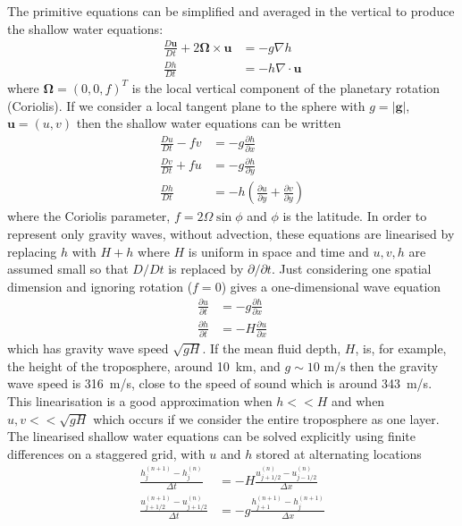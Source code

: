 The primitive equations can be simplified and averaged in the vertical
to produce the shallow water equations:
\begin{align}
\frac{D\mathbf{u}}{Dt}+2\bm{\Omega}\times\mathbf{u} & =-g\nabla h\label{eq:SWu_vec}\\
\frac{Dh}{Dt} & =-h\nabla\cdot\mathbf{u}\label{eq:SWh_vec}
\end{align}
where $\bm{\Omega}=\left(0,0,f\right)^{T}$ is the local vertical
component of the planetary rotation (Coriolis). If we consider a local
tangent plane to the sphere with $g=|\mathbf{g}|$, $\mathbf{u}=(u,v)$
then the shallow water equations can be written
\begin{align}
\frac{Du}{Dt}-fv & =-g\frac{\partial h}{\partial x}\label{eq:SWu}\\
\frac{Dv}{Dt}+fu & =-g\frac{\partial h}{\partial y}\label{eq:SWv}\\
\frac{Dh}{Dt} & =-h\left(\frac{\partial u}{\partial y}+\frac{\partial v}{\partial y}\right)\label{eq:SWh}
\end{align}
where the Coriolis parameter, $f=2\Omega\sin\phi$ and $\phi$ is
the latitude. In order to represent only gravity waves, without advection,
these equations are linearised by replacing $h$ with $H+h$ where
$H$ is uniform in space and time and $u,v,h$ are assumed small so
that $D/Dt$ is replaced by $\partial/\partial t$. Just considering
one spatial dimension and ignoring rotation ($f=0$) gives a one-dimensional
wave equation
\begin{align}
\frac{\partial u}{\partial t} & =-g\frac{\partial h}{\partial x}\label{eq:linSWu}\\
\frac{\partial h}{\partial t} & =-H\frac{\partial u}{\partial x}\label{eq:linSWh}
\end{align}
which has gravity wave speed $\sqrt{gH}$. If the mean fluid depth,
$H$, is, for example, the height of the troposphere, around 10~km,
and $g\sim10\text{ m/s}$ then the gravity wave speed is 316~m/s,
close to the speed of sound which is around 343~m/s. This linearisation
is a good approximation when $h<<H$ and when $u,v<<\sqrt{gH}$ which
occurs if we consider the entire troposphere as one layer. The linearised
shallow water equations can be solved explicitly using finite differences
on a staggered grid, with $u$ and $h$ stored at alternating locations
\citep[similar to the excellent choice made by][]{Rich22}
\begin{align}
\frac{h_{j}^{(n+1)}-h_{j}^{(n)}}{\Delta t} & =-H\frac{u_{j+1/2}^{(n)}-u_{j-1/2}^{(n)}}{\Delta x}\label{eq:linSWh_FB_C}\\
\frac{u_{j+1/2}^{(n+1)}-u_{j+1/2}^{(n)}}{\Delta t} & =-g\frac{h_{j+1}^{(n+1)}-h_{j}^{(n+1)}}{\Delta x}\label{eq:linSWu_FB_C}
\end{align}
